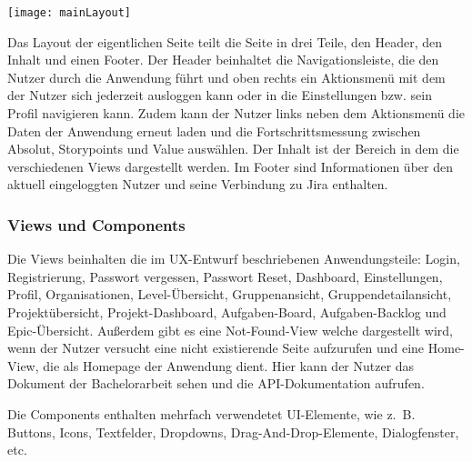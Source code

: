 \vspace{20pt}
\begin{center}
    \begin{minipage}{0.8\linewidth}
        \texttt{[image: mainLayout]}
    \end{minipage}
\end{center}
\vspace{20pt}

Das Layout der eigentlichen Seite teilt die Seite in drei Teile, den Header, den Inhalt und einen Footer. Der Header beinhaltet die Navigationsleiste, die den Nutzer durch die Anwendung führt und oben rechts ein Aktionsmenü mit dem der Nutzer sich jederzeit ausloggen kann oder in die Einstellungen bzw. sein Profil navigieren kann. Zudem kann der Nutzer links neben dem Aktionsmenü die Daten der Anwendung erneut laden und die Fortschrittsmessung zwischen Absolut, Storypoints und Value auswählen. Der Inhalt ist der Bereich in dem die verschiedenen Views dargestellt werden. Im Footer sind Informationen über den aktuell eingeloggten Nutzer und seine Verbindung zu Jira enthalten.

\subsubsection{Views und Components}
Die Views beinhalten die im UX-Entwurf beschriebenen Anwendungsteile: Login, Registrierung, Passwort vergessen, Passwort Reset, Dashboard, Einstellungen, Profil, Organisationen, Level-Übersicht, Gruppenansicht, Gruppendetailansicht, Projektübersicht, Projekt-Dashboard, Aufgaben-Board, Aufgaben-Backlog und Epic-Übersicht. Außerdem gibt es eine Not-Found-View welche dargestellt wird, wenn der Nutzer versucht eine nicht existierende Seite aufzurufen und eine Home-View, die als Homepage der Anwendung dient. Hier kann der Nutzer das Dokument der Bachelorarbeit sehen und die API-Dokumentation aufrufen.

Die Components enthalten mehrfach verwendetet UI-Elemente, wie z. B. Buttons, Icons, Textfelder, Dropdowns, Drag-And-Drop-Elemente, Dialogfenster, etc.


